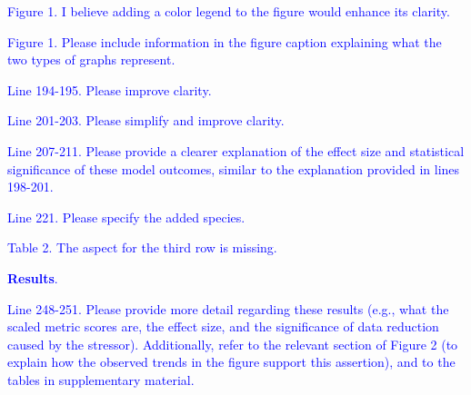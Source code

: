 \documentclass[
]{article}
\begin{document}
\textcolor{blue}{Figure 1. I believe adding a color legend to the figure would enhance its clarity.}

\textcolor{blue}{Figure 1. Please include information in the figure caption explaining what the two types of graphs represent.}

\textcolor{blue}{Line 194-195. Please improve clarity.}

\textcolor{blue}{Line 201-203. Please simplify and improve clarity.}

\textcolor{blue}{Line 207-211. Please provide a clearer explanation of the effect size and statistical significance of these model outcomes, similar to the explanation provided in lines 198-201.}

\textcolor{blue}{Line 221. Please specify the added species.}

\textcolor{blue}{Table 2. The aspect for the third row is missing.}

\textcolor{blue}{\textbf{Results}.}

\textcolor{blue}{Line 248-251. Please provide more detail regarding these results (e.g., what the scaled metric scores are, the effect size, and the significance of data reduction caused by the stressor). Additionally, refer to the relevant section of Figure 2 (to explain how the observed trends in the figure support this assertion), and to the tables in supplementary material.}
\end{document}

